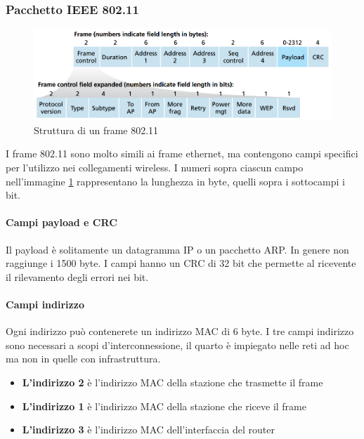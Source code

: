 \documentclass[11pt,a4paper]{article}
\begin{document}
{\subsubsection{Pacchetto IEEE 802.11}
\begin{figure}
	\begin{center}
		\includegraphics[scale=0.6]{img/101.png}
		\caption{Struttura di un frame 802.11}
		\label{fig: 101}
	\end{center}
\end{figure}
I frame 802.11 sono molto simili ai frame ethernet, ma contengono campi specifici per l'utilizzo nei collegamenti wireless. I numeri sopra ciascun campo nell'immagine \ref{fig: 101} rappresentano la lunghezza in byte, quelli sopra i sottocampi i bit.
\paragraph{Campi payload e CRC}
Il payload è solitamente un datagramma IP o un pacchetto ARP. In genere non raggiunge i 1500 byte. I campi hanno un CRC di 32 bit che permette al ricevente il rilevamento degli errori nei bit.

\paragraph{Campi indirizzo}
Ogni indirizzo può contenerete un indirizzo MAC di 6 byte. I tre campi indirizzo sono necessari a scopi d'interconnessione, il quarto è impiegato nelle reti ad hoc ma non in quelle con infrastruttura.
\begin{itemize}
	\item \textbf{L'indirizzo 2} è l'indirizzo MAC della stazione che trasmette il frame
	\item \textbf{L'indirizzo 1} è l'indirizzo MAC della stazione che riceve il frame
	\item \textbf{L'indirizzo 3} è l'indirizzo MAC dell'interfaccia del router
\end{itemize}

}
\end{document}
